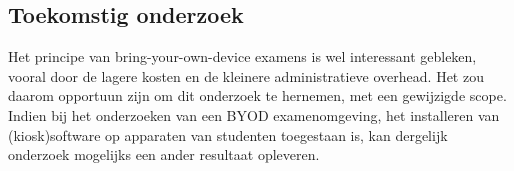 \documentclass[a0,portrait]{a0poster}
\begin{document}
\begin{multicols}{2}
\color{HoGentAccent1} 
\section*{Toekomstig onderzoek}
\color{black}

Het principe van bring-your-own-device examens is wel interessant gebleken, vooral door de lagere kosten en de kleinere administratieve overhead. Het zou daarom opportuun zijn om dit onderzoek te hernemen, met een gewijzigde scope. Indien bij het onderzoeken van een BYOD examenomgeving, het installeren van (kiosk)software op apparaten van studenten toegestaan is, kan dergelijk onderzoek mogelijks een ander resultaat opleveren.


\end{multicols}
\end{document}
